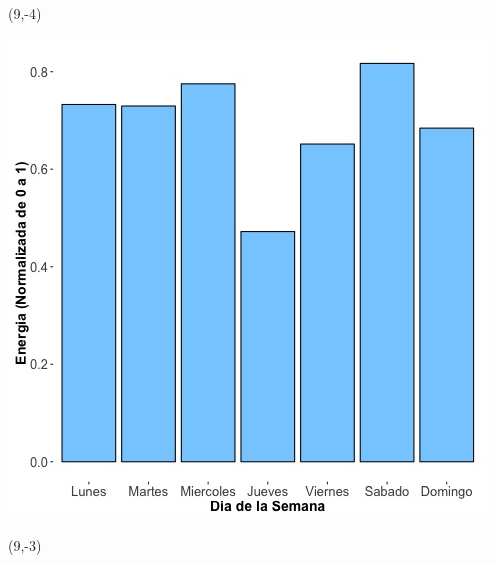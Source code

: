 \documentclass{article}\usepackage[]{graphicx}\usepackage[]{color}
\newenvironment{knitrout}{}{} %
\begin{document}
 \begin{textblock}{1}(9,-4)
\begin{minipage}{20em}
\begingroup

\endgroup
\end{minipage}
\end{textblock}


\begin{knitrout}
\color{fgcolor}
\includegraphics[scale=0.65]{figure/A22_day_of_week_plot} 
\end{knitrout}


 \begin{textblock}{1}(9,-3)
\begin{minipage}{20em}
\begingroup

\endgroup
\end{minipage}
\end{textblock}

 \vspace{2cm}
\end{document}
